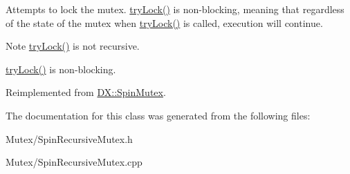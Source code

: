 Attempts to lock the mutex. \hyperlink{class_d_x_1_1_spin_recursive_mutex_a9150334e2741a1de69f177491214cf15}{try\-Lock()} is non-\/blocking, meaning that regardless of the state of the mutex when \hyperlink{class_d_x_1_1_spin_recursive_mutex_a9150334e2741a1de69f177491214cf15}{try\-Lock()} is called, execution will continue. 

\begin{DoxyNote}{Note}
\hyperlink{class_d_x_1_1_spin_recursive_mutex_a9150334e2741a1de69f177491214cf15}{try\-Lock()} is not recursive. 

\hyperlink{class_d_x_1_1_spin_recursive_mutex_a9150334e2741a1de69f177491214cf15}{try\-Lock()} is non-\/blocking. 
\end{DoxyNote}


Reimplemented from \hyperlink{class_d_x_1_1_spin_mutex_af1a59657616a8c68ff5785e18e53a469}{D\-X\-::\-Spin\-Mutex}.



The documentation for this class was generated from the following files\-:\begin{DoxyCompactItemize}
\item 
Mutex/Spin\-Recursive\-Mutex.\-h\item 
Mutex/Spin\-Recursive\-Mutex.\-cpp\end{DoxyCompactItemize}
